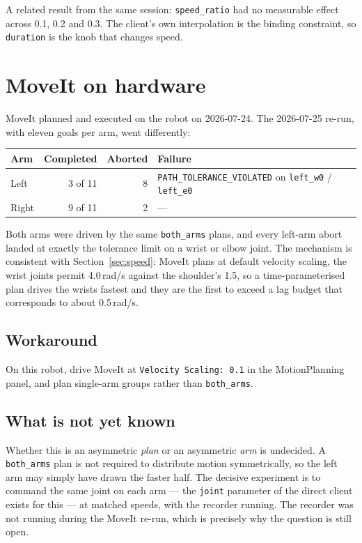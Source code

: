 A related result from the same session: \texttt{speed\_ratio} had no measurable
effect across 0.1, 0.2 and 0.3. The client's own interpolation is the binding
constraint, so \texttt{duration} is the knob that changes speed.

\section{MoveIt on hardware}
\label{sec:moveit-hardware}

MoveIt planned and executed on the robot on 2026-07-24. The 2026-07-25 re-run,
with eleven goals per arm, went differently:

\begin{table}[h]
\centering
\small
\begin{tabular}{@{}lrrl@{}}
\toprule
\textbf{Arm} & \textbf{Completed} & \textbf{Aborted} & \textbf{Failure} \\
\midrule
Left  & 3 of 11 & 8 & \texttt{PATH\_TOLERANCE\_VIOLATED} on \texttt{left\_w0} / \texttt{left\_e0} \\
Right & 9 of 11 & 2 & --- \\
\bottomrule
\end{tabular}
\end{table}

Both arms were driven by the same \texttt{both\_arms} plans, and every left-arm
abort landed at exactly the tolerance limit on a wrist or elbow joint. The
mechanism is consistent with Section~\ref{sec:speed}: MoveIt plans at default
velocity scaling, the wrist joints permit 4.0\,rad/s against the shoulder's 1.5,
so a time-parameterised plan drives the wrists fastest and they are the first to
exceed a lag budget that corresponds to about 0.5\,rad/s.

\subsection{Workaround}

On this robot, drive MoveIt at \texttt{Velocity Scaling: 0.1} in the
MotionPlanning panel, and plan single-arm groups rather than \texttt{both\_arms}.

\subsection{What is not yet known}

Whether this is an asymmetric \emph{plan} or an asymmetric \emph{arm} is
undecided. A \texttt{both\_arms} plan is not required to distribute motion
symmetrically, so the left arm may simply have drawn the faster half. The
decisive experiment is to command the same joint on each arm --- the
\texttt{joint} parameter of the direct client exists for this --- at matched
speeds, with the recorder running. The recorder was not running during the
MoveIt re-run, which is precisely why the question is still open.

